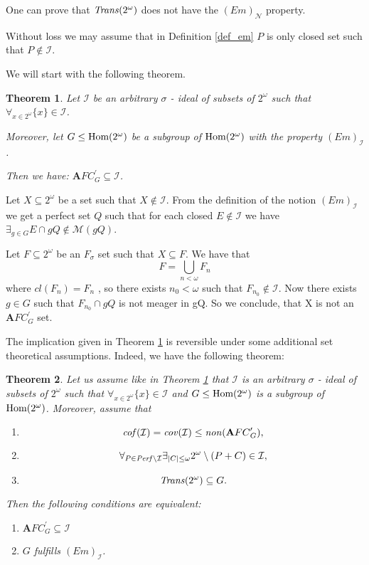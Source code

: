 \documentclass[b5cutpaper, twoside, 11pt, leqno]{moravica}
\newcommand{\nlto}{n < \omega}
\newcommand{\afcp}{{\mathbf AFC}^\prime}
\newcommand\afcg{\afcp_{G}}
\newcommand\trans{{\it Trans}(\ca)}
\newcommand{\seq}{\subseteq}
\newcommand{\ca}{2^{\omega}}
\newcommand{\mgr}{{\mathcal M}}
\newcommand{\neglig}{{\mathcal N}}
\newcommand{\oo}{\omega}
\newcommand{\perf}{{\it Perf}}
\newcommand{\cof}{{\it cof}}
\newcommand{\cov}{{\it cov}}
\newcommand{\non}{{\it non}}
\newcommand{\calI}{{\mathcal{I}}}
\newcommand\Hom{{\rm Hom(\ca)}}
\newtheorem{theorem}{Theorem}[section]
\theoremstyle{definition}
\begin{document}
One can prove that $\trans$ does not have the $(Em)_{\neglig}$ property.

Without loss we may assume that in Definition \ref{def_em}
$P$ is only closed set such that $P \not\in \calI$.

We will start with the following theorem.

\begin{theorem}
\label{em=>afcg->i}
  Let $\calI$ be an arbitrary $\sigma$ - ideal of subsets of $\ca$
such that $\forall_{x\in\ca} \lbrace x \rbrace \in \calI$.

  Moreover, let $G \leq \Hom$
be a subgroup of $\Hom$ with the property $(Em)_{\calI}$.

  Then we have:
$\afcg \seq \calI$.
\end{theorem}

\proof

Let $X \seq \ca$ be a set such that $X \not\in \calI$.
From the definition of
the notion $(Em)_{\calI}$ we get a perfect set $Q$ such that
for each closed $E \not\in \calI$ we have
$\exists_{g \in G} E \cap gQ \not\in \mgr(gQ)$.

Let $F \seq \ca$ be an $F_{\sigma}$ set
such that $X \seq F$.
We have that
$$F = \bigcup_{ \nlto } F_n$$
where $cl(F_n) = F_n$ , so there exists $n_0 < \omega$
such that $F_{n_0} \not\in \calI$.
Now there exists $g \in G$
such that $F_{n_0} \cap gQ$
is not meager in gQ.
So we conclude, that X is not an $\afcg$ set.

\bigskip

The implication given in Theorem \ref{em=>afcg->i} is reversible
under some additional set theoretical assumptions.
Indeed, we have the following theorem:

\begin{theorem}
\label{em<=>afcg->i}
  Let us assume like in Theorem \ref{em=>afcg->i}
that $\calI$ is an arbitrary $\sigma$ - ideal of subsets of $\ca$
such that $\forall_{x\in\ca} \lbrace x \rbrace \in \calI$ and
$G \leq \Hom$ is a subgroup of $\Hom$.
  Moreover, assume that
\begin{enumerate}
  \item
    \[ \cof(\calI) = \cov(\calI) \leq \non(\afcg), \]
  \item
    \[ \forall_{P\in\perf\setminus\calI} \exists_{|C| \leq \oo}
      \ca \setminus (P + C) \in \calI, \]
  \item
    \[ \trans \seq G. \]
\end{enumerate}

Then the following conditions are equivalent:

\begin{enumerate}
  \item
    $\afcg \seq \calI$
  \item
    $G$ fulfills $(Em)_{\calI}$.
\end{enumerate}
\end{theorem}
\end{document}
